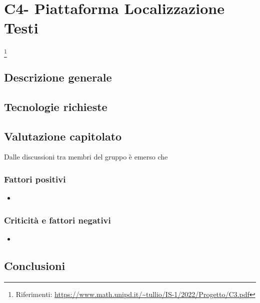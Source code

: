 
\renewcommand{\capName}{Piattaforma Localizzazione Testi} %
\renewcommand{\capCode}{C4} %
\renewcommand{\capLink}{https://www.math.unipd.it/~tullio/IS-1/2022/Progetto/C3.pdf} %
\renewcommand{\capProposer}{zero12} %


\section{\capCode - \capName} \footnote{Riferimenti: \url{\capLink}}
\subsection{Descrizione generale}

\subsection{Tecnologie richieste}

\subsection{Valutazione capitolato}
Dalle discussioni tra membri del gruppo è emerso che

\subsubsection{Fattori positivi}

\begin{itemize}
    \item 
\end{itemize}

\subsubsection{Criticità e fattori negativi}

\begin{itemize}
    \item 
\end{itemize}

\subsection{Conclusioni}
